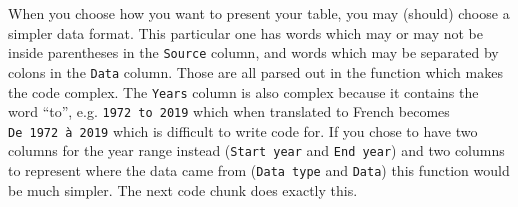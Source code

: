 \documentclass[12pt]{article}\usepackage[]{graphicx}\usepackage[]{color}
\newenvironment{Shaded}{}{}
\newcommand{\KeywordTok}[1]{\textcolor[rgb]{0.00,0.44,0.13}{\textbf{{#1}}}}
\newcommand{\DataTypeTok}[1]{\textcolor[rgb]{0.56,0.13,0.00}{{#1}}}
\newcommand{\DecValTok}[1]{\textcolor[rgb]{0.25,0.63,0.44}{{#1}}}
\newcommand{\StringTok}[1]{\textcolor[rgb]{0.25,0.44,0.63}{{#1}}}
\newcommand{\CommentTok}[1]{\textcolor[rgb]{0.38,0.63,0.69}{\textit{{#1}}}}
\newcommand{\OtherTok}[1]{\textcolor[rgb]{0.00,0.44,0.13}{{#1}}}
\newcommand{\NormalTok}[1]{{#1}}
\newcommand{\OperatorTok}[1]{\textcolor[rgb]{0.00,0.44,0.13}{\textbf{{#1}}}}
\newcommand{\ControlFlowTok}[1]{\textcolor[rgb]{0.00,0.44,0.13}{\textbf{{#1}}}}
\begin{document}
When you choose how you want to present your table, you may (should) choose a simpler data format. This particular one has words which may or may not be inside parentheses in the \texttt{Source} column, and words which may be separated by colons in the \texttt{Data} column. Those are all parsed out in the function which makes the code complex. The \texttt{Years} column is also complex because it contains the word ``to'', e.g. \texttt{1972\ to\ 2019} which when translated to French becomes \texttt{De\ 1972\ à\ 2019} which is difficult to write code for. If you chose to have two columns for the year range instead (\texttt{Start\ year} and \texttt{End\ year}) and two columns to represent where the data came from (\texttt{Data\ type} and \texttt{Data}) this function would be much simpler. The next code chunk does exactly this.
\begin{Shaded}
\end{Shaded}
\end{document}
